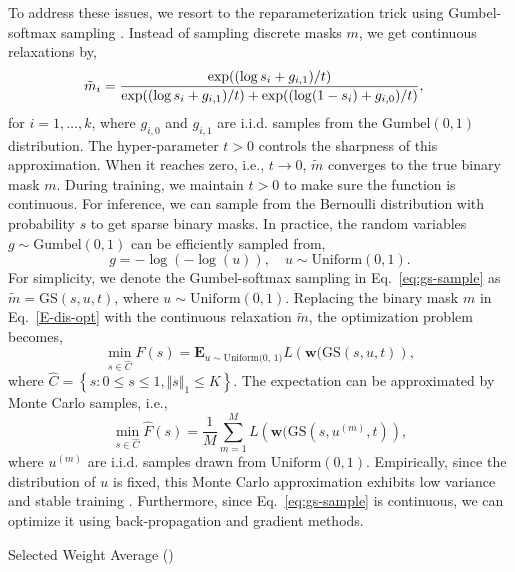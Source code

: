 To address these issues, we resort to the reparameterization trick using Gumbel-softmax sampling \citep{jang2017categorical,maddison2017the}.
Instead of sampling discrete masks $m$, we get continuous relaxations by,
\begin{equation}\label{eq:gs-sample}
\small \!\!\!\!\!  \tilde{m}_i = \frac{\exp((\log s_i + g_{i, 1}) / t)}{\exp((\log s_i + g_{i, 1}) / t) + \exp((\log (1 - s_i) + g_{i, 0}) / t)},
\end{equation}
for $i = 1, \dots, k$, where $g_{i, 0}$ and $g_{i, 1}$ are i.i.d. samples from the $\text{Gumbel}(0, 1)$ distribution. The hyper-parameter $t > 0$ controls the sharpness of this approximation. When it reaches zero, i.e., $t \to 0$, $\tilde{m}$ converges to the true binary mask $m$. During training, we maintain $t > 0$ to make sure the function is continuous. For inference, we can sample from the Bernoulli distribution with probability $s$ to get sparse binary masks. In practice, the random variables $g \sim \text{Gumbel}(0, 1)$ can be efficiently sampled from,
\begin{equation*}
    g = - \log ( - \log (u)), \quad u \sim \text{Uniform}(0, 1).
\end{equation*}
For simplicity, we denote the Gumbel-softmax sampling in Eq.~\eqref{eq:gs-sample} as $\tilde{m} = \text{GS}(s, u, t)$, where $u \sim \text{Uniform}(0, 1)$. Replacing the binary mask $m$ in Eq.~\eqref{E-dis-opt} with the continuous relaxation $\tilde{m}$, the optimization problem becomes,
\begin{equation*}
    \min_{s\in \hat{C}}F(s)=\mathbf{E}_{u \sim \text{Uniform(0, 1)}} L\left(\textbf{w}(\text{GS}(s, u, t)\right),
\end{equation*}
where $\hat{C}=\left\{s: 0\leq s\leq 1, \Vert s\Vert_1\leq K \right\}$. The expectation can be approximated by Monte Carlo samples, i.e.,
\begin{equation*}
    \min_{s\in \hat{C}} \hat{F}(s)= \frac{1}{M} \sum_{m=1}^M L\left(\textbf{w}(\text{GS}(s, u^{(m)}, t)\right),
\end{equation*}
where $u^{(m)}$ are i.i.d. samples drawn from $\text{Uniform}(0, 1)$.
Empirically, since the distribution of $u$ is fixed, this Monte Carlo approximation exhibits low variance and stable training \cite{kingma2013auto,rezende2014stochastic}. Furthermore, since Eq.~\eqref{eq:gs-sample} is continuous, we can optimize it using back-propagation and gradient methods.

\begin{algorithm2e}[t]
    \caption{Selected Weight Average (\method{})}\label{alg:gs}
\end{algorithm2e}

